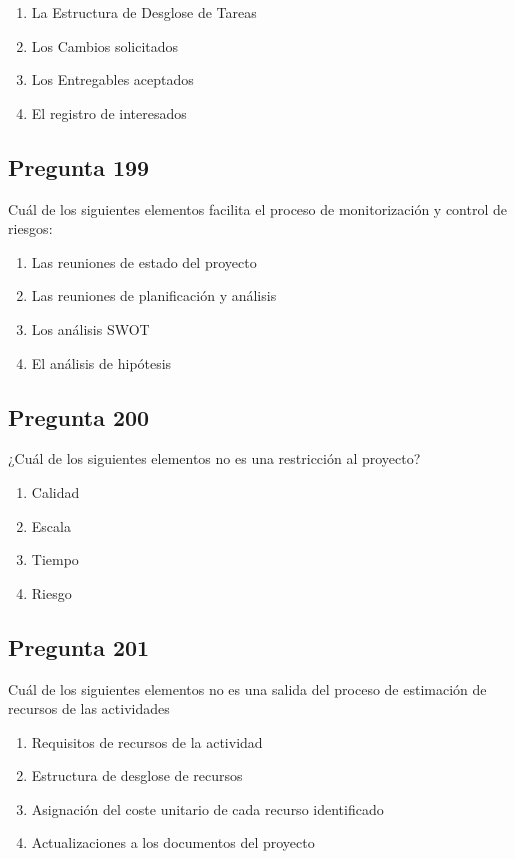 \documentclass[11pt,a4paper]{article}
\begin{document}
\begin{enumerate}[label=\alph*)]
  \item La Estructura de Desglose de Tareas
  \item Los Cambios solicitados
  \item Los Entregables aceptados
  \item El registro de interesados
\end{enumerate}

\subsection*{Pregunta 199}
Cuál de los siguientes elementos facilita el proceso de monitorización y control de riesgos:

\begin{enumerate}[label=\alph*)]
  \item Las reuniones de estado del proyecto
  \item Las reuniones de planificación y análisis
  \item Los análisis SWOT
  \item El análisis de hipótesis
\end{enumerate}

\subsection*{Pregunta 200}
¿Cuál de los siguientes elementos no es una restricción al proyecto?

\begin{enumerate}[label=\alph*)]
  \item Calidad
  \item Escala
  \item Tiempo
  \item Riesgo
\end{enumerate}

\subsection*{Pregunta 201}
Cuál de los siguientes elementos no es una salida del proceso de estimación de recursos de las actividades

\begin{enumerate}[label=\alph*)]
  \item Requisitos de recursos de la actividad
  \item Estructura de desglose de recursos
  \item Asignación del coste unitario de cada recurso identificado
  \item Actualizaciones a los documentos del proyecto
\end{enumerate}
\end{document}
